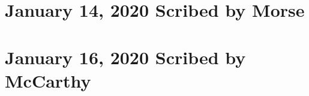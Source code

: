 \documentclass{article}
\begin{document}
\section{January 14, 2020 \hfill Scribed by Morse}

\newpage

\section{January 16, 2020 \hfill Scribed by McCarthy}

\newpage
\end{document}
